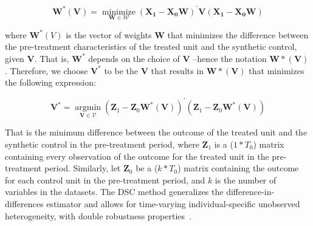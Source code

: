 \begin{equation}
    \mathbf{W^{*}(V)}=\underset{\mathbf{W} \in \mathcal{W}}{\operatorname{minimize}}\left(\mathbf{X}_{\mathbf{1}}-\mathbf{X}_{\mathbf{0}} \mathbf{W}\right)^{\prime} \mathbf{V}\left(\mathbf{X}_{\mathbf{1}}-\mathbf{X}_{\mathbf{0}} \mathbf{W}\right)
\end{equation}

where $\mathbf{W}^{*}(V)$ is the vector of weights $\mathbf{W}$ that minimizes the difference between the pre-treatment characteristics of the treated unit and the synthetic control, given $\mathbf{V}$. That is, $\mathbf{W^{*}}$ depends on the choice of $\mathbf{V}$ –hence the notation $\mathbf{W*(V)}$. Therefore, we choose $\mathbf{V^{*}}$ to be the $\mathbf{V}$ that results in $\mathbf{W*(V)}$ that minimizes the following expression:

\begin{equation}
    \mathbf{V}^{*}=\underset{\mathbf{V} \in \mathcal{V}}{\operatorname{argmin}}\left(\mathbf{Z}_{1}-\mathbf{Z}_{0} \mathbf{W}^{*}(\mathbf{V})\right)^{\prime}\left(\mathbf{Z}_{1}-\mathbf{Z}_{0} \mathbf{W}^{*}(\mathbf{V})\right)
\end{equation}

That is the minimum difference between the outcome of the treated unit and the synthetic control in the pre-treatment period, where $\mathbf{Z}_{1}$ is a ($1*T_0$) matrix containing every observation of the outcome for the treated unit in the pre-treatment period. Similarly, let $\mathbf{Z}_{0}$ be a ($k * T_0$) matrix containing the outcome for each control unit in the pre-treatment period, and $k$ is the number of variables in the datasets.
The DSC method generalizes the difference-in-differences estimator and allows for time-varying individual-specific unobserved heterogeneity, with double robustness properties~\cite{billmeier2013, smith2015}.



